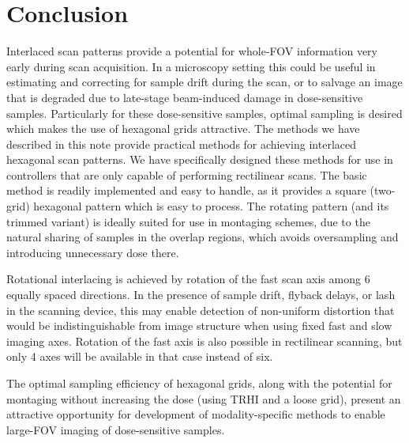 \documentclass{article}
\begin{document}
\section{Conclusion}
\label{sec:conclusion}

Interlaced scan patterns provide a potential for whole-FOV information very
early during scan acquisition.
%
In a microscopy setting this could be useful in estimating and correcting for sample drift during the scan, or to salvage an image that is degraded due to late-stage beam-induced damage in dose-sensitive samples.
%
Particularly for these dose-sensitive samples, optimal sampling is desired which makes the use of hexagonal grids attractive.
%
The methods we have described in this note provide practical methods for achieving interlaced hexagonal scan patterns.
%
We have specifically designed these methods for use in controllers that are only
capable of performing rectilinear scans.
%
The basic method is readily implemented and easy to handle, as it provides a square (two-grid) hexagonal pattern which is easy to process.
%
The rotating pattern (and its trimmed variant) is ideally suited for use in montaging schemes, due to the natural sharing of samples in the overlap regions, which avoids oversampling and introducing unnecessary dose there.
%


Rotational interlacing is achieved by rotation of the fast scan axis among 6
equally spaced directions.
%
In the presence of sample drift, flyback delays, or lash in the scanning device,
this may enable detection of non-uniform distortion that would be
indistinguishable from image structure when using fixed fast and slow imaging
axes.
%
Rotation of the fast axis is also possible in rectilinear scanning, but only 4
axes will be available in that case instead of six.


The optimal sampling efficiency of hexagonal grids, along with the potential for
montaging without increasing the dose (using TRHI and a loose grid), present an
attractive opportunity for development of modality-specific methods to enable
large-FOV imaging of dose-sensitive samples.



\end{document}
